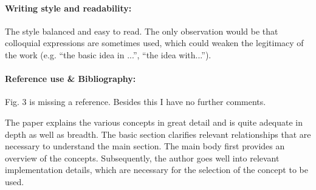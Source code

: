 \documentclass[12pt]{scrartcl}
\begin{document}






\paragraph{Writing style and readability:} The style balanced and easy to read. The only observation would be that colloquial expressions are sometimes used, which could weaken
the legitimacy of the work (e.g. ``the basic idea in ...'', ``the idea with...'').








\paragraph{Reference use \& Bibliography:} Fig. 3 is missing a reference.
Besides this I have no further comments.


The paper explains the various concepts in great detail and is quite adequate in depth as well as breadth. The basic section clarifies relevant relationships that are necessary to understand the main section. 
The main body first provides an overview of the concepts. Subsequently, the author goes well into relevant implementation details, which are necessary for the selection of the concept to be used.

\end{document}
